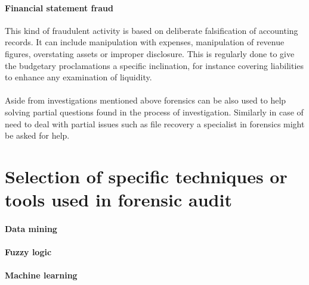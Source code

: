 \paragraph {Financial statement fraud}
This kind of fraudulent activity is based on deliberate falsification of accounting records. It can include manipulation with expenses, manipulation of revenue figures, overstating assets or improper disclosure. This is regularly done to give the budgetary proclamations a specific inclination, for instance covering liabilities to enhance any examination of liquidity.


\paragraph{} Aside from investigations mentioned above forensics can be also used to help solving partial questions found in the process of investigation. Similarly in case of need to deal with partial issues such as file recovery a specialist in forensics might be asked for help.



\section{Selection of specific techniques or tools used in forensic audit}
\paragraph {Data mining}

\paragraph {Fuzzy logic}

\paragraph {Machine learning}

\paragraph {}



